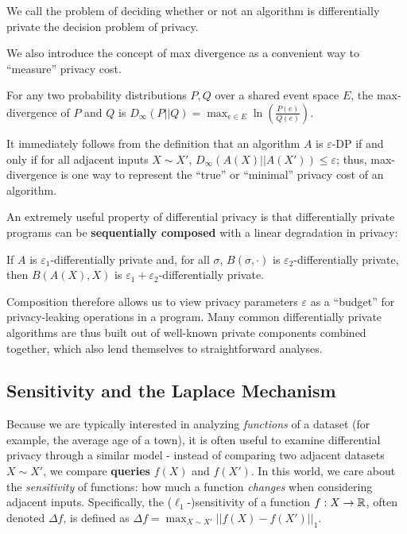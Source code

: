 We call the problem of deciding whether or not an algorithm is differentially private the decision problem of privacy.

We also introduce the concept of max divergence as a convenient way to ``measure'' privacy cost.

\begin{defn}
    For any two probability distributions $P, Q$ over a shared event space $E$, the max-divergence of $P$ and $Q$ is 
    $D_{\infty}(P||Q) = \max_{e\in E}\ln\left(\frac{P(e)}{Q(e)}\right)$.
\end{defn}

It immediately follows from the definition that an algorithm $A$ is $\varepsilon$-DP if and only if for all adjacent inputs $X\sim X'$, $D_{\infty}(A(X)||A(X'))\leq \varepsilon$; thus, max-divergence is one way to represent the ``true'' or ``minimal'' privacy cost of an algorithm.

An extremely useful property of differential privacy is that differentially private programs can be \textbf{sequentially composed} with a linear degradation in privacy:

\begin{thm}
    If $A$ is $\varepsilon_1$-differentially private and, for all $\sigma$, $B(\sigma, \cdot)$ is $\varepsilon_2$-differentially private, then $B(A(X), X)$ is $\varepsilon_1+\varepsilon_2$-differentially private. 
\end{thm}

Composition therefore allows us to view privacy parameters $\varepsilon$ as a ``budget'' for privacy-leaking operations in a program. Many common differentially private algorithms are thus built out of well-known private components combined together, which also lend themselves to straightforward analyses. 

\subsection{Sensitivity and the Laplace Mechanism}

Because we are typically interested in analyzing \textit{functions} of a dataset (for example, the average age of a town), it is often useful to examine differential privacy through a similar model - instead of comparing two adjacent datasets $X\sim X'$, we compare \textbf{queries} $f(X)$ and $f(X')$. In this world, we care about the \textit{sensitivity} of functions: how much a function \textit{changes} when considering adjacent inputs. 
Specifically, the ($\ell_1$-)sensitivity of a function $f: X\to \mathbb{R}$, often denoted $\Delta f$, is defined as $\Delta f = \max_{X\sim X'}||f(X)-f(X')||_1$.

